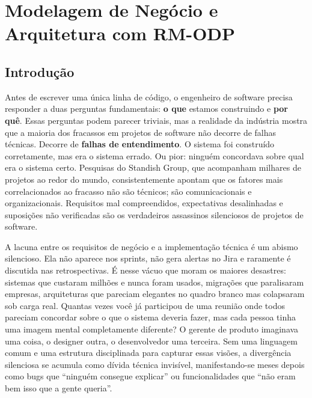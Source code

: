 \chapter{Modelagem de Negócio e Arquitetura com RM-ODP}

\section{Introdução}

Antes de escrever uma única linha de código, o engenheiro de software precisa
responder a duas perguntas fundamentais: \textbf{o que} estamos construindo e
\textbf{por quê}. Essas perguntas podem parecer triviais, mas a realidade da
indústria mostra que a maioria dos fracassos em projetos de software não decorre
de falhas técnicas. Decorre de \textbf{falhas de entendimento}. O sistema foi
construído corretamente, mas era o sistema errado. Ou pior: ninguém concordava
sobre qual era o sistema certo. Pesquisas do Standish Group, que acompanham
milhares de projetos ao redor do mundo, consistentemente apontam que os fatores
mais correlacionados ao fracasso não são técnicos; são comunicacionais e
organizacionais. Requisitos mal compreendidos, expectativas desalinhadas e
suposições não verificadas são os verdadeiros assassinos silenciosos de projetos
de software.

A lacuna entre os requisitos de negócio e a implementação técnica é um abismo
silencioso. Ela não aparece nos sprints, não gera alertas no Jira e raramente é
discutida nas retrospectivas. É nesse vácuo que moram os maiores
desastres: sistemas que custaram milhões e nunca foram usados, migrações que
paralisaram empresas, arquiteturas que pareciam elegantes no quadro branco mas
colapsaram sob carga real. Quantas vezes você já participou de uma
reunião onde todos pareciam concordar sobre o que o sistema deveria fazer, mas
cada pessoa tinha uma imagem mental completamente diferente? O gerente de produto
imaginava uma coisa, o designer outra, o desenvolvedor uma terceira. Sem uma
linguagem comum e uma estrutura disciplinada para capturar essas visões, a
divergência silenciosa se acumula como dívida técnica invisível, manifestando-se
meses depois como bugs que ``ninguém consegue explicar'' ou funcionalidades que
``não eram bem isso que a gente queria''.

